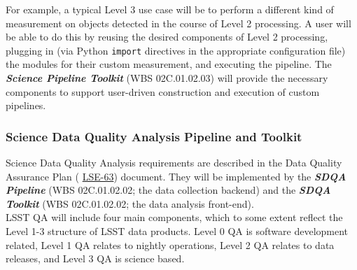 \documentclass[12pt]{article}
\newcommand{\ds}[2]{{\color{blue} \href{https://docushare.lsstcorp.org/docushare/dsweb/Get/#1}{#2}}\xspace}
\newcommand{\SDQAP}{\ds{LSE-63}{LSE-63}}
\newcommand{\wbsSDQAP}{WBS 02C.01.02.02}
\newcommand{\wbsSDQAT}{WBS 02C.01.02.02}
\newcommand{\wbsSPT}{WBS 02C.01.02.03}
\begin{document}
For example, a typical Level 3 use case will be to perform a different kind of measurement on objects detected in the course of Level 2 processing. A user will be able to do this by reusing the desired components of Level 2 processing, plugging in (via Python {\tt import} directives in the appropriate configuration file) the modules for their custom measurement, and executing the pipeline. The {\bf \emph{Science Pipeline Toolkit}} (\wbsSPT) will provide the necessary components to support user-driven construction and execution of custom pipelines.

\subsubsection{Science Data Quality Analysis Pipeline and Toolkit}

Science Data Quality Analysis requirements are described in the Data Quality Assurance Plan (\SDQAP) document. They will be implemented by the {\bf \emph{SDQA Pipeline}} (\wbsSDQAP; the data collection backend) and the {\bf \emph{SDQA Toolkit}} (\wbsSDQAT; the data analysis front-end).
\\

LSST QA will include four main components, which to some extent reflect the Level 1-3 structure of LSST data products. Level 0 QA is software development related, Level 1 QA relates to nightly operations, Level 2 QA relates to data releases, and Level 3 QA is science based.
\end{document}
